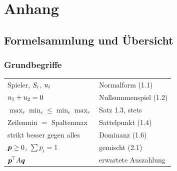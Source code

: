 \appendix
\part{Anhang}

\newcommand{\lit}[3]{\vspace{5pt}\noindent\textbf{[#1]} #2\par\nopagebreak\vspace{1pt}{\small\itshape\color{grau} #3}\par\vspace{2pt}}

\chapter{Formelsammlung und Übersicht}

\section{Grundbegriffe}

\begin{merksatz}
\begin{center}
{\small
\renewcommand{\arraystretch}{1.62}
\begin{tabular}{@{}P{4.4cm}P{4.2cm}@{}}
\toprule
Spieler, $S_i$, $u_i$ & Normalform (1.1)\\
$u_1+u_2 = 0$ & Nullsummenspiel (1.2)\\
$\max_r\min_c \le \min_c\max_r$ & Satz 1.3, stets\\
Zeilenmin $=$ Spaltenmax & Sattelpunkt (1.4)\\
strikt besser gegen alles & Dominanz (1.6)\\
$\boldsymbol{p} \ge 0$, $\sum p_i = 1$ & gemischt (2.1)\\
$\boldsymbol{p}^{\!\top}A\boldsymbol{q}$ & erwartete Auszahlung\\
\bottomrule
\end{tabular}}
\end{center}
\end{merksatz}

